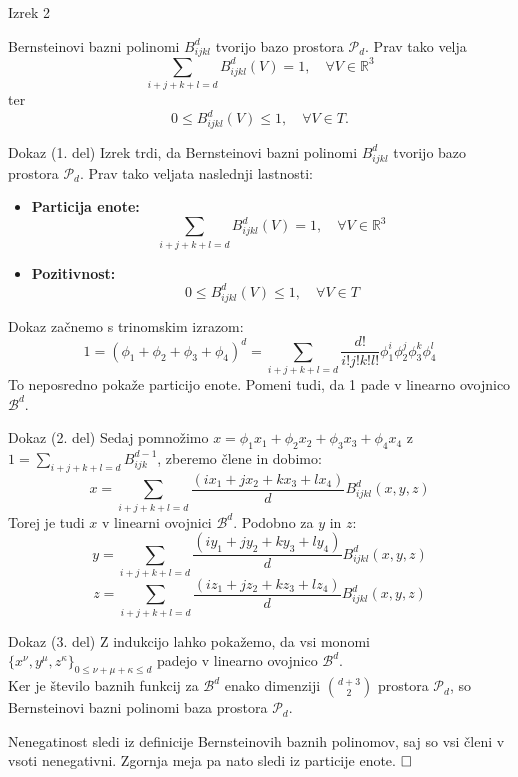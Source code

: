 \documentclass{beamer}
\begin{document}
\begin{frame}{Izrek 2}
\begin{theorem}\label{izrek_bernstein}
    Bernsteinovi bazni polinomi $B_{ijkl}^d$ tvorijo bazo prostora $\mathcal{P}_d$.
    Prav tako velja 
    \begin{equation}\label{eq_partcija_enote}
        \sum_{i+j+k+l = d} B_{ijkl}^d(V) = 1, \quad \forall V \in \mathbb{R}^3     
    \end{equation}
    ter
    \begin{equation}
        0 \leq B_{ijkl}^d(V) \leq 1, \quad \forall V \in T.
    \end{equation}
\end{theorem}
\end{frame}

\begin{frame}{Dokaz (1. del)}
    Izrek trdi, da Bernsteinovi bazni polinomi $B_{ijkl}^d$ tvorijo bazo prostora $\mathcal{P}_d$. Prav tako veljata naslednji lastnosti:
    \begin{itemize}
        \item \textbf{Particija enote:}
        \[
        \sum_{i+j+k+l = d} B_{ijkl}^d(V) = 1, \quad \forall V \in \mathbb{R}^3
        \]
        \item \textbf{Pozitivnost:}
        \[
        0 \leq B_{ijkl}^d(V) \leq 1, \quad \forall V \in T
        \]
    \end{itemize}
    Dokaz začnemo s trinomskim izrazom:
    \[
    1 = (\phi_1 + \phi_2 + \phi_3 + \phi_4)^d = \sum_{i+j+k+l=d} \frac{d!}{i!j!k!l!} \phi_1^i \phi_2^j \phi_3^k \phi_4^l
    \]
    To neposredno pokaže particijo enote. Pomeni tudi, da 1 pade v linearno ovojnico $\mathcal{B}^d$.
\end{frame}

\begin{frame}{Dokaz (2. del)}
    Sedaj pomnožimo $x = \phi_1 x_1 + \phi_2 x_2 + \phi_3 x_3 + \phi_4 x_4$ z $1 = \sum_{i+j+k+l=d} B^{d-1}_{ijk}$, zberemo člene in dobimo:
    \[
    x = \sum_{i+j+k+l=d} \frac{(i x_1 + j x_2 + k x_3 + l x_4)}{d} B_{ijkl}^d(x, y, z)
    \]
    Torej je tudi $x$ v linearni ovojnici $\mathcal{B}^d$. Podobno za $y$ in $z$:
    \[
    y = \sum_{i+j+k+l=d} \frac{(i y_1 + j y_2 + k y_3 + l y_4)}{d} B_{ijkl}^d(x, y, z)
    \]
    \[
    z = \sum_{i+j+k+l=d} \frac{(i z_1 + j z_2 + k z_3 + l z_4)}{d} B_{ijkl}^d(x, y, z)
    \]
\end{frame}

\begin{frame}{Dokaz (3. del)}
    Z indukcijo lahko pokažemo, da vsi monomi $\{ x^\nu, y^\mu, z^\kappa \}_{0\leq \nu + \mu + \kappa \leq d} $ padejo v linearno ovojnico $\mathcal{B}^d$. \\
    Ker je število baznih funkcij za $\mathcal{B}^d$ enako dimenziji $\binom{d+3}{2}$ prostora $\mathcal{P}_d$, so Bernsteinovi bazni polinomi baza prostora $\mathcal{P}_d$.
 
    Nenegatinost sledi iz definicije Bernsteinovih baznih polinomov, saj so vsi členi v vsoti nenegativni. Zgornja meja pa nato sledi iz particije enote.
    $\hfill \square$
\end{frame}
\end{document}
